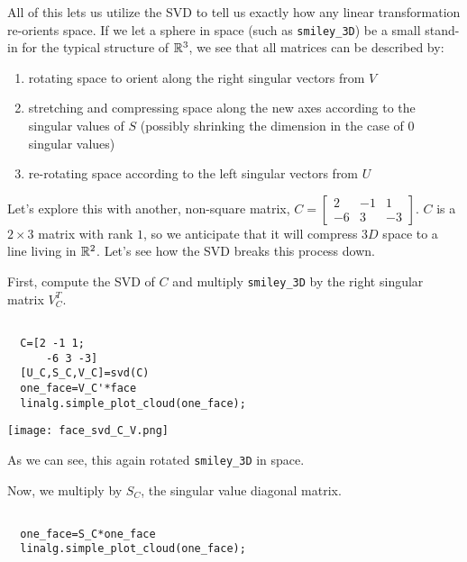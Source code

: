 \documentclass{ximera}
\begin{document}
All of this lets us utilize the SVD to tell us exactly how any linear transformation re-orients space. If we let a sphere in space (such as \texttt{smiley\_3D}) be a small stand-in for the typical structure of $\mathbb{R}^3$, we see that all matrices can be described by:

\begin{enumerate}

  \item rotating space to orient along the right singular vectors from $V$
  \item stretching and compressing space along the new axes according to the singular values of $S$ (possibly shrinking the dimension in the case of $0$ singular values)
  \item re-rotating space according to the left singular vectors from $U$

\end{enumerate}

Let's explore this with another, non-square matrix, $C=\begin{bmatrix}
  2 & -1 & 1\\
  -6 & 3 & -3
\end{bmatrix}$. $C$ is a $2\times 3$ matrix with rank $1$, so we anticipate that it will compress $3D$ space to a line living in $\mathbb{R}^2$. Let's see how the SVD breaks this process down.

First, compute the SVD of $C$ and multiply \texttt{smiley\_3D} by the right singular matrix $V_C^T$.

\begin{verbatim}

  C=[2 -1 1;
      -6 3 -3]
  [U_C,S_C,V_C]=svd(C)
  one_face=V_C'*face
  linalg.simple_plot_cloud(one_face);

\end{verbatim}

\begin{center}
  \texttt{[image: face\_svd\_C\_V.png]}
\end{center}

As we can see, this again rotated \texttt{smiley\_3D} in space.

Now, we multiply by $S_C$, the singular value diagonal matrix.

\begin{verbatim}

  one_face=S_C*one_face
  linalg.simple_plot_cloud(one_face);

\end{verbatim}
\end{document}
